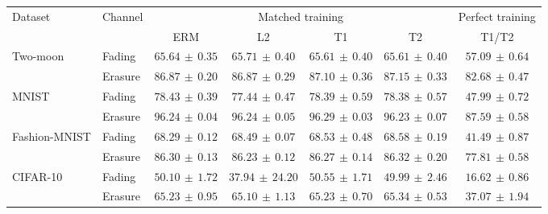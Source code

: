 \begin{tabular*}{\linewidth}{@{\extracolsep{\fill}}llccccc@{}}
\toprule
\multirow{2}{*}{Dataset} & \multirow{2}{*}{Channel} & \multicolumn{4}{c}{Matched training} & Perfect training \\
\cmidrule(lr){3-6}\cmidrule(l){7-7}
 & & ERM & L2 & T1 & T2 & T1/T2 \\
\midrule
\multirow{2}{*}{Two-moon} & Fading & $65.64\,\pm\,0.35$ & $\mathbf{65.71}\,\pm\,0.40$ & $65.61\,\pm\,0.40$ & $65.61\,\pm\,0.40$ & $57.09\,\pm\,0.64$ \\
 & Erasure & $86.87\,\pm\,0.20$ & $86.87\,\pm\,0.29$ & $87.10\,\pm\,0.36$ & $\mathbf{87.15}\,\pm\,0.33$ & $82.68\,\pm\,0.47$ \\
\midrule[0.25pt]
\multirow{2}{*}{MNIST} & Fading & $\mathbf{78.43}\,\pm\,0.39$ & $77.44\,\pm\,0.47$ & $78.39\,\pm\,0.59$ & $78.38\,\pm\,0.57$ & $47.99\,\pm\,0.72$ \\
 & Erasure & $96.24\,\pm\,0.04$ & $96.24\,\pm\,0.05$ & $\mathbf{96.29}\,\pm\,0.03$ & $96.23\,\pm\,0.07$ & $87.59\,\pm\,0.58$ \\
\midrule[0.25pt]
\multirow{2}{*}{Fashion-MNIST} & Fading & $68.29\,\pm\,0.12$ & $68.49\,\pm\,0.07$ & $68.53\,\pm\,0.48$ & $\mathbf{68.58}\,\pm\,0.19$ & $41.49\,\pm\,0.87$ \\
 & Erasure & $86.30\,\pm\,0.13$ & $86.23\,\pm\,0.12$ & $86.27\,\pm\,0.14$ & $\mathbf{86.32}\,\pm\,0.20$ & $77.81\,\pm\,0.58$ \\
\midrule[0.25pt]
\multirow{2}{*}{CIFAR-10} & Fading & $50.10\,\pm\,1.72$ & $37.94\,\pm\,24.20$ & $\mathbf{50.55}\,\pm\,1.71$ & $49.99\,\pm\,2.46$ & $16.62\,\pm\,0.86$ \\
 & Erasure & $65.23\,\pm\,0.95$ & $65.10\,\pm\,1.13$ & $65.23\,\pm\,0.70$ & $\mathbf{65.34}\,\pm\,0.53$ & $37.07\,\pm\,1.94$ \\
\bottomrule
\end{tabular*}
